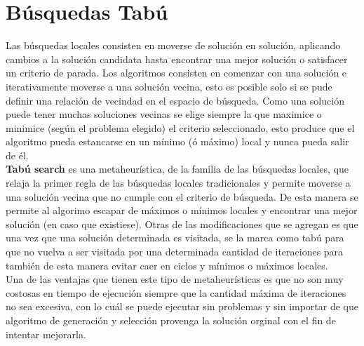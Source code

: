 \section{Búsquedas Tabú}
Las búsquedas locales consisten en moverse de solución en solución, aplicando cambios a la solución candidata hasta encontrar una mejor solución o satisfacer un criterio de parada. Los algoritmos consisten en comenzar con una solución e iterativamente moverse a una solución vecina, esto es posible solo si se pude definir una relación de vecindad en el espacio de búsqueda. Como una solución puede tener muchas soluciones vecinas se elige siempre la que maximice o minimice (según el problema elegido) el criterio seleccionado, esto produce que el algoritmo pueda estancarse en un mínimo (ó máximo) local y nunca pueda salir de él.\\
\textbf{Tabú search} es una metaheurística, de la familia de las búsquedas locales, que relaja la primer regla de las búsquedas locales tradicionales y permite moverse a una solución vecina que no cumple con el criterio de búsqueda. De esta manera se permite al algorimo escapar de máximos o mínimos locales y encontrar una mejor solución (en caso que existiese). Otras de las modificaciones que se agregan es que una vez que una solución determinada es visitada, se la marca como tabú para que no vuelva a ser visitada por una determinada cantidad de iteraciones para también de esta manera evitar caer en ciclos y mínimos o máximos locales.\\
Una de las ventajas que tienen este tipo de metaheurísticas es que no son muy costosas en tiempo de ejecución siempre que la cantidad máxima de iteraciones no sea excesiva, con lo cuál se puede ejecutar sin problemas y sin importar de que algoritmo de generación y selección provenga la solución orginal con el fin de intentar mejorarla.\\
